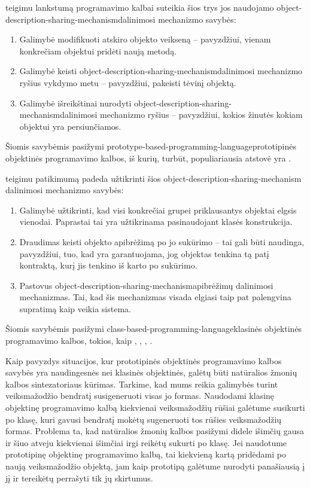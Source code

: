 \cite{Lieberman:1987:TO:62139.62144} teigimu lankstumą programavimo
kalbai suteikia šios trys jos naudojamo
\gls{object-description-sharing-mechanism}{dalinimosi mechanizmo}
savybės:
\begin{enumerate}
  \item Galimybė modifikuoti atskiro objekto veikseną – pavyzdžiui,
    vienam konkrečiam objektui pridėti naują metodą.
  \item Galimybė keisti
    \gls{object-description-sharing-mechanism}{dalinimosi
    mechanizmo} ryšius vykdymo metu – pavyzdžiui, pakeisti tėvinį
    objektą.
  \item Galimybė išreikštinai nurodyti
    \gls{object-description-sharing-mechanism}{dalinimosi mechanizmo}
    ryšius – pavyzdžiui, kokios žinutės kokiam objektui yra
    persiunčiamos.
\end{enumerate}
Šiomis savybėmis pasižymi
\gls{prototype-based-programming-language}{prototipinės objektinės
programavimo kalbos}, iš kurių, turbūt, populiariausia atstovė yra
.

\cite{Lieberman:1987:TO:62139.62144} teigimu patikimumą padeda
užtikrinti šios \gls{object-description-sharing-mechanism}{%
dalinimosi mechanizmo} savybės:
\begin{enumerate}
  \item Galimybė užtikrinti, kad visi konkrečiai grupei priklausantys
    objektai elgsis vienodai. Paprastai tai yra užtikrinama
    pasinaudojant klasės konstrukcija.
  \item Draudimas keisti objekto apibrėžimą po jo sukūrimo – tai
    gali būti naudinga, pavyzdžiui, tuo, kad yra garantuojama,
    jog objektas tenkina tą patį kontraktą, kurį jis tenkino iš
    karto po sukūrimo.
  \item Pastovus 
    \gls{object-description-sharing-mechanism}{apibrėžimų dalinimosi
    mechanizmas}. Tai, kad šis mechanizmas visada elgiasi taip
    pat palengvina supratimą kaip veikia sistema.
\end{enumerate}
Šiomis savybėmis pasižymi
\gls{class-based-programming-language}{klasinės objektinės
programavimo kalbos}, tokios, kaip , ,
, .

Kaip pavyzdys situacijos, kur prototipinės objektinės programavimo
kalbos savybės yra naudingesnės nei klasinės objektinės, galėtų
būti natūralios žmonių kalbos sintezatoriaus kūrimas. Tarkime, kad
mums reikia galimybės turint veiksmažodžio bendratį susigeneruoti
visas jo formas. Naudodami klasinę objektinę programavimo kalbą
kiekvienai veiksmažodžių rūšiai galėtume susikurti po klasę,
kuri gavusi bendratį mokėtų sugeneruoti tos rūšies veiksmažodžių
formas. Problema ta, kad natūralios žmonių kalbos pasižymi didele
išimčių gausa ir šiuo atveju kiekvienai išimčiai irgi reikėtų
sukurti po klasę. Jei naudotume prototipinę objektinę programavimo
kalbą, tai kiekvieną kartą pridėdami po naują veiksmažodžio
objektą, jam kaip prototipą galėtume nurodyti panašiausią į jį ir
tereikėtų perrašyti tik jų skirtumus.

